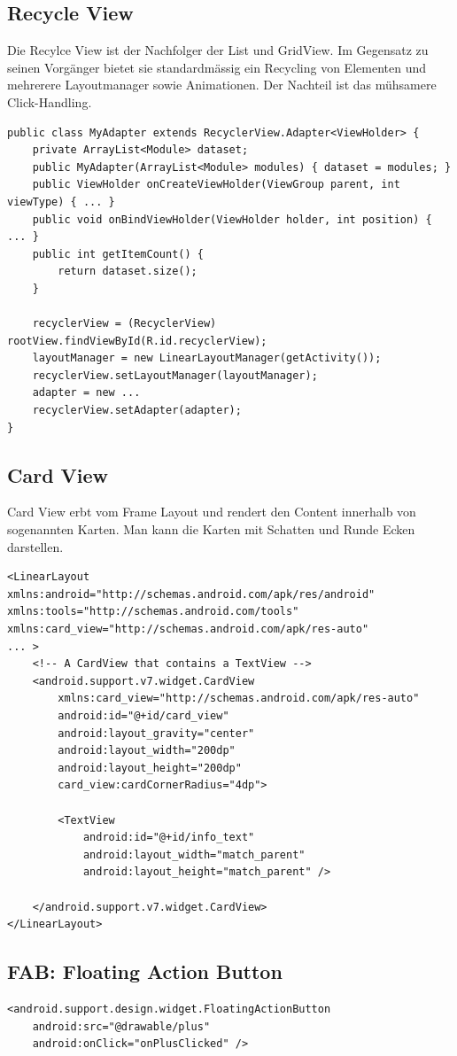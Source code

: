 \subsection{Recycle View}
Die Recylce View ist der Nachfolger der List und GridView. Im Gegensatz zu seinen Vorgänger bietet sie standardmässig ein Recycling von Elementen und mehrerere Layoutmanager sowie Animationen. Der Nachteil ist das mühsamere Click-Handling.
\begin{lstlisting}[caption=Recycler View]
public class MyAdapter extends RecyclerView.Adapter<ViewHolder> {
	private ArrayList<Module> dataset;
	public MyAdapter(ArrayList<Module> modules) { dataset = modules; }
	public ViewHolder onCreateViewHolder(ViewGroup parent, int viewType) { ... }
	public void onBindViewHolder(ViewHolder holder, int position) { ... }
	public int getItemCount() {
		return dataset.size();
	}
	
	recyclerView = (RecyclerView) rootView.findViewById(R.id.recyclerView);
	layoutManager = new LinearLayoutManager(getActivity());
	recyclerView.setLayoutManager(layoutManager);
	adapter = new ...
	recyclerView.setAdapter(adapter);
}
\end{lstlisting}

\subsection{Card View}
Card View erbt vom Frame Layout und rendert den Content innerhalb von sogenannten Karten. Man kann die Karten mit Schatten und Runde Ecken darstellen.
\begin{lstlisting}[caption=Card View]
<LinearLayout xmlns:android="http://schemas.android.com/apk/res/android"
xmlns:tools="http://schemas.android.com/tools"
xmlns:card_view="http://schemas.android.com/apk/res-auto"
... >
	<!-- A CardView that contains a TextView -->
	<android.support.v7.widget.CardView
		xmlns:card_view="http://schemas.android.com/apk/res-auto"
		android:id="@+id/card_view"
		android:layout_gravity="center"
		android:layout_width="200dp"
		android:layout_height="200dp"
		card_view:cardCornerRadius="4dp">
	
		<TextView
			android:id="@+id/info_text"
			android:layout_width="match_parent"
			android:layout_height="match_parent" />
		
	</android.support.v7.widget.CardView>
</LinearLayout>
\end{lstlisting}

\subsection{FAB: Floating Action Button}
\begin{lstlisting}[caption=Floating Action Button]
<android.support.design.widget.FloatingActionButton
	android:src="@drawable/plus"
	android:onClick="onPlusClicked" />
\end{lstlisting}

